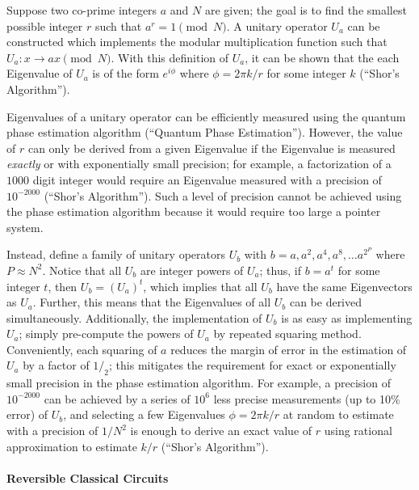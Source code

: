 \documentclass[11pt]{article}
\begin{document}
Suppose two co-prime integers \(a\) and \(N\) are given; the goal is to
find the smallest possible integer \(r\) such that \(a^r=1\pmod N\). A
unitary operator \(U_a\) can be constructed which implements the modular
multiplication function such that \(U_a: x\rightarrow ax\pmod N\). With
this definition of \(U_a\), it can be shown that the each Eigenvalue of
\(U_a\) is of the form \(e^{i\phi}\) where \(\phi=2\pi k/r\) for some
integer \(k\) (``Shor's Algorithm'').

Eigenvalues of a unitary operator can be efficiently measured using the
quantum phase estimation algorithm (``Quantum Phase Estimation'').
However, the value of \(r\) can only be derived from a given Eigenvalue
if the Eigenvalue is measured \emph{exactly} or with exponentially small
precision; for example, a factorization of a \(1000\) digit integer
would require an Eigenvalue measured with a precision of \(10^{-2000}\)
(``Shor's Algorithm''). Such a level of precision cannot be achieved
using the phase estimation algorithm because it would require too large
a pointer system.

Instead, define a family of unitary operators \(U_b\) with
\(b=a, a^2, a^4, a^8,\dots a^{2^P}\) where \(P\approx N^2\). Notice that
all \(U_b\) are integer powers of \(U_a\); thus, if \(b=a^t\) for some
integer \(t\), then \(U_b=(U_a)^t\), which implies that all \(U_b\) have
the same Eigenvectors as \(U_a\). Further, this means that the
Eigenvalues of all \(U_b\) can be derived simultaneously. Additionally,
the implementation of \(U_b\) is as easy as implementing \(U_a\); simply
pre-compute the powers of \(U_a\) by repeated squaring method.
Conveniently, each squaring of \(a\) reduces the margin of error in the
estimation of \(U_a\) by a factor of \(1/_2\); this mitigates the
requirement for exact or exponentially small precision in the phase
estimation algorithm. For example, a precision of \(10^{-2000}\) can be
achieved by a series of \(10^6\) less precise measurements (up to 10\%
error) of \(U_b\), and selecting a few Eigenvalues \(\phi=2\pi k/r\) at
random to estimate with a precision of \(1/N^2\) is enough to derive an
exact value of \(r\) using rational approximation to estimate \(k/r\)
(``Shor's Algorithm'').

    \hypertarget{reversible-classical-circuits}{%
\paragraph{Reversible Classical
Circuits}\label{reversible-classical-circuits}}
\end{document}
